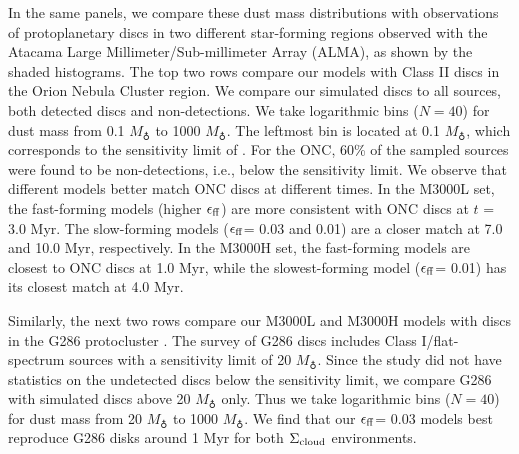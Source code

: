 \documentclass[fleqn,usenatbib]{mnras}
\newcommand\sfeff{\ensuremath{\epsilon_{\rm ff}}\xspace}   %
\newcommand\Sigmacloud{\ensuremath{\Sigma_{\rm cloud}}\xspace} %
\begin{document}
In the same panels, we compare these dust mass distributions with observations of protoplanetary discs in two different star-forming regions observed with the Atacama Large Millimeter/Sub-millimeter Array (ALMA), as shown by the shaded histograms. The top two rows compare our models with Class II discs in the Orion Nebula Cluster \citep[ONC;][]{Eisner2018ApJ...860...77E} region. We compare our simulated discs to all sources, both detected discs and non-detections. We take logarithmic bins ($N = 40$) for dust mass from 0.1 $M_{\earth}$ to 1000 $M_{\earth}$. The leftmost bin is located at 0.1 $M_{\earth}$, which corresponds to the sensitivity limit of \citet{Eisner2018ApJ...860...77E}. For the ONC, 60\% of the sampled sources were found to be non-detections, i.e., below the sensitivity limit. We observe that different models better match ONC discs at different times. In the M3000L set, the fast-forming models (higher \sfeff) are more consistent with ONC discs at $t$ = 3.0 Myr. The slow-forming models (\sfeff = 0.03 and 0.01) are a closer match at 7.0 and 10.0 Myr, respectively. In the M3000H set, the fast-forming models are closest to ONC discs at 1.0 Myr, while the slowest-forming model (\sfeff = 0.01) has its closest match at 4.0 Myr.

Similarly, the next two rows compare our M3000L and M3000H models with discs in the G286 protocluster \citep{Cheng2022ApJ...940..124C}. The \citet{Cheng2022ApJ...940..124C} survey of G286 discs includes Class I/flat-spectrum sources with a sensitivity limit of 20 $M_{\earth}$. Since the study did not have statistics on the undetected discs below the sensitivity limit, we compare G286 with simulated discs above 20 $M_{\earth}$ only. Thus we take logarithmic bins ($N = 40$) for dust mass from 20 $M_{\earth}$ to 1000 $M_{\earth}$. We find that our \sfeff = 0.03 models best reproduce G286 disks around 1 Myr for both \Sigmacloud environments.

\end{document}
